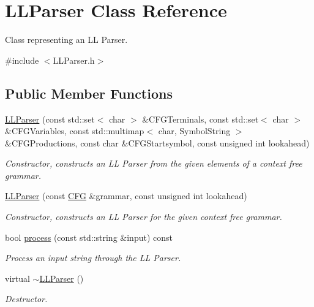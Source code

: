 \hypertarget{class_l_l_parser}{\section{L\-L\-Parser Class Reference}
\label{class_l_l_parser}
}


Class representing an L\-L Parser.  




{\ttfamily \#include $<$L\-L\-Parser.\-h$>$}

\subsection*{Public Member Functions}
\begin{DoxyCompactItemize}
\item 
\hyperlink{class_l_l_parser_afcc6a86b5054cedcdab1e682885103cb}{L\-L\-Parser} (const std\-::set$<$ char $>$ \&C\-F\-G\-Terminals, const std\-::set$<$ char $>$ \&C\-F\-G\-Variables, const std\-::multimap$<$ char, Symbol\-String $>$ \&C\-F\-G\-Productions, const char \&C\-F\-G\-Startsymbol, const unsigned int lookahead)
\begin{DoxyCompactList}\small\item\em Constructor, constructs an L\-L Parser from the given elements of a context free grammar. \end{DoxyCompactList}\item 
\hyperlink{class_l_l_parser_ac1f82371afde6215cdb47226317f8a64}{L\-L\-Parser} (const \hyperlink{class_c_f_g}{C\-F\-G} \&grammar, const unsigned int lookahead)
\begin{DoxyCompactList}\small\item\em Constructor, constructs an L\-L Parser for the given context free grammar. \end{DoxyCompactList}\item 
bool \hyperlink{class_l_l_parser_a3c849d307e60f966469d21c76f7ddc58}{process} (const std\-::string \&input) const 
\begin{DoxyCompactList}\small\item\em Process an input string through the L\-L Parser. \end{DoxyCompactList}\item 
\hypertarget{class_l_l_parser_afcc3d3e47b886797f852c50c705ffb5d}{virtual \hyperlink{class_l_l_parser_afcc3d3e47b886797f852c50c705ffb5d}{$\sim$\-L\-L\-Parser} ()}\label{class_l_l_parser_afcc3d3e47b886797f852c50c705ffb5d}

\begin{DoxyCompactList}\small\item\em Destructor. \end{DoxyCompactList}\end{DoxyCompactItemize}
